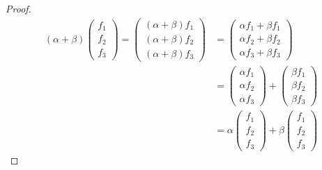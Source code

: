 \documentclass[12pt]{article}
\begin{document}
\begin{itemize}
\begin{itemize}
\begin{proof}
                \begin{align*}
                    (\alpha + \beta) \begin{pmatrix}f_1 \\ f_2 \\ f_3 \end{pmatrix} = \begin{pmatrix}(\alpha + \beta)f_1 \\ (\alpha + \beta)f_2 \\ (\alpha + \beta)f_3 \end{pmatrix} &= \begin{pmatrix}\alpha f_1 + \beta f_1 \\ \alpha f_2 + \beta f_2 \\ \alpha f_3 + \beta f_3 \end{pmatrix} \\
                    &= \begin{pmatrix}\alpha f_1 \\ \alpha f_2 \\ \alpha f_3 \end{pmatrix} + \begin{pmatrix}\beta f_1 \\ \beta f_2 \\ \beta f_3\end{pmatrix} \\
                    &= \alpha \begin{pmatrix}f_1 \\ f_2 \\ f_3 \end{pmatrix} + \beta\begin{pmatrix}f_1 \\ f_2 \\ f_3 \end{pmatrix}
                \end{align*}


\end{proof}
\end{itemize}
\end{itemize}
\end{document}
